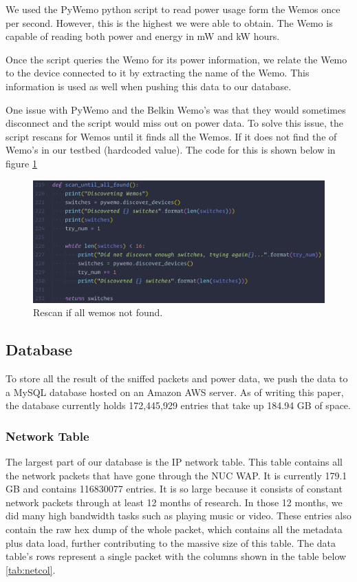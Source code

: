 We used the PyWemo python script to read power usage form the Wemos once per second. However, this is the highest we were able to obtain. The Wemo is capable of reading both power and energy in mW and kW hours.

Once the script queries the Wemo for its power information, we relate the Wemo to the device connected to it by extracting the name of the Wemo. This information is used as well when pushing this data to our database.

One issue with PyWemo and the Belkin Wemo's was that they would sometimes disconnect and the script would miss out on power data. To solve this issue, the script rescans for Wemos until it finds all the Wemos. If it does not find the of Wemo's in our testbed (hardcoded value). The code for this is shown below in figure \ref{fig:wemoRescanCode}

\begin{figure}[H]
    \centering
    \includegraphics[width=1\textwidth]{figures/wemoRescanCode.png}
    \caption{Rescan if all wemos not found.}
    \label{fig:wemoRescanCode}
\end{figure}

\subsection{Database}
\label{Database}

To store all the result of the sniffed packets and power data, we push the data to a MySQL database hosted on an Amazon AWS server. As of writing this paper, the database currently holds 172,445,929 entries that take up 184.94 GB of space.

\subsubsection{Network Table}

The largest part of our database is the IP network table. This table contains all the network packets that have gone through the NUC WAP. It is currently 179.1 GB and contains 116830077 entries. It is so large because it consists of constant network packets through at least 12 months of research. In those 12 months, we did many high bandwidth tasks such as playing music or video. These entries also contain the raw hex dump of the whole packet, which contains all the metadata plus data load, further contributing to the massive size of this table. The data table's rows represent a single packet with the columns shown in the table below \ref{tab:netcol}.

